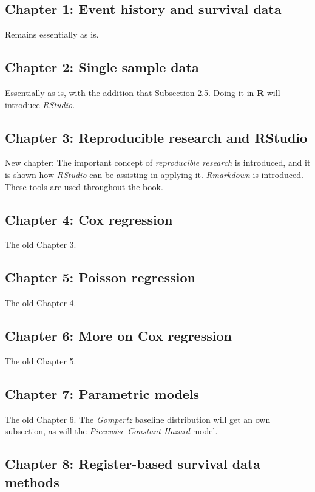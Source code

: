 \documentclass[a4paper,11pt]{article}
\begin{document}
\subsection*{Chapter 1: Event history and survival data}

Remains essentially as is.

\subsection*{Chapter 2: Single sample data}

Essentially as is, with the addition that Subsection 2.5. Doing it in {\bf
  R} will introduce \emph{RStudio}.

\subsection*{Chapter 3: Reproducible research and RStudio}

New chapter: The important concept of \emph{reproducible research} is
introduced, and it is shown how \emph{RStudio} can be assisting in applying
it. \emph{Rmarkdown} is introduced. These tools are used throughout the
book.

\subsection*{Chapter 4: Cox regression}

The old Chapter 3.

\subsection*{Chapter 5: Poisson regression}

The old Chapter 4.

\subsection*{Chapter 6: More on Cox regression}

The old Chapter 5.

\subsection*{Chapter 7: Parametric models}

The old Chapter 6. The \emph{Gompertz} baseline distribution will get an
own subsection, as will the \emph{Piecewise Constant Hazard} model.

\subsection*{Chapter 8: Register-based survival data methods}
\end{document}

